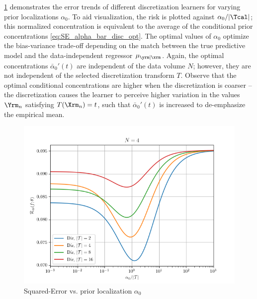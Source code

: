 \documentclass[12pt]{report}
\begin{document}
\cref{fig:Discretization/SE/risk_a0norm_leg_T} demonstrates the error trends of different discretization learners for varying prior localizations $\alpha_0$. To aid visualization, the risk is plotted against $\alpha_0 / |\Tcal|$; this normalized concentration is equivalent to the average of the conditional prior concentrations \eqref{eq:SE_alpha_bar_disc_opt}. The optimal values of $\alpha_0$ optimize the bias-variance trade-off depending on the match between the true predictive model and the data-independent regressor $\mu_{\yrm | \xrm}$. Again, the optimal concentrations $\bar{\alpha}_0'(t)$ are independent of the data volume $N$; however, they are not independent of the selected discretization transform $T$. Observe that the optimal conditional concentrations are higher when the discretization is coarser -- the discretization causes the learner to perceive higher variation in the values $\Yrm_n$ satisfying $T(\Xrm_n) = t$, such that $\bar{\alpha}_0'(t)$ is increased to de-emphasize the empirical mean. 
\begin{figure}
	\centering
	\includegraphics[width=0.8\linewidth]{Discretization/SE/risk_a0norm_leg_T.png}
	\caption{Squared-Error vs. prior localization $\alpha_0$}
	\label{fig:Discretization/SE/risk_a0norm_leg_T}
\end{figure} 
\end{document}

